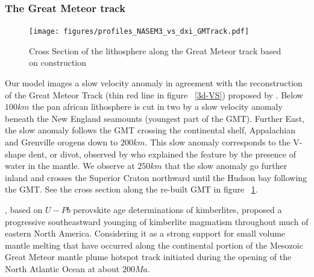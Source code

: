 \documentclass[12pt]{article}
\begin{document}


\subsubsection{The Great Meteor track}
	\begin{figure}[h]
		\centerline{\texttt{[image: figures/profiles\_NASEM3\_vs\_dxi\_GMTrack.pdf]}}

		\caption{Cross Section of the lithosphere along the Great Meteor track based on \cite{heaman2000timing} construction}
		\label{gmtcross}

	\end{figure}

	Our model images a slow velocity anomaly in agreement with the reconstruction of the Great Meteor Track (thin red line in figure ~\ref{3d-VS}) proposed by \cite{heaman2000timing}.
	Below $100km$ the pan african lithosphere is cut in two by a slow velocity anomaly beneath the New England seamounts (youngest part of the GMT). Further East, the slow anomaly follows the GMT crossing the continental shelf, Appalachian and Grenville orogens down to $200km$. 
	This slow anomaly corresponds to the V-shape dent, or divot, observed by \cite{lee1997upper} who explained the feature by the presence of water in the mantle. 
	We observe at $250km$ that the slow anomaly go further inland and crosses the Superior Craton northward until the Hudson bay following the GMT.
	See the cross section along the re-built GMT in figure ~\ref{gmtcross}.

	\cite{heaman2000timing}, based on $U-Pb$ perovskite age determinations of kimberlites, proposed a progressive southeastward younging of kimberlite magmatism throughout much of eastern North America. Considering it as a strong support for small volume mantle melting that have occurred along the continental portion of the Mesozoic Great Meteor mantle plume hotspot track initiated during the opening of the North Atlantic Ocean at about $200Ma$. \citep[See figure 4. in][]{heaman2000timing}
\end{document}
